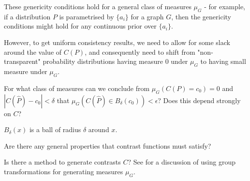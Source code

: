 \begin{question}\label{q:generalised_genericity}
    These genericity conditions hold for a general class of measures $\mu_G$ - for example, if a distribution $P$ is parametrised by $\{a_i\}$ for a graph $G$, then the genericity conditions might hold for any continuous prior over $\{a_i\}$.
    
    However, to get uniform consistency results, we need to allow for some slack around the value of $C(P)$, and consequently need to shift from "non-transparent" probability distributions having measure 0 under $\mu_G$ to having small measure under $\mu_G$.
    
    For what class of measures can we conclude from $\mu_G(C(P)=c_0)=0$ and $|C(\hat{P})-c_0|<\delta$ that $\mu_G(C(\hat{P})\in B_\delta (c_0)) < \epsilon$? Does this depend strongly on $C$?
    
    $B_\delta(x)$ is a ball of radius $\delta$ around $x$.
\end{question}
    
\begin{question}
    Are there any general properties that contrast functions must satisfy?
\end{question}

\begin{question}
    Is there a method to generate contrasts $C$? See \cite{besserve_group_2017} for a discussion of using group transformations for generating measures $\mu_G$.
\end{question}
